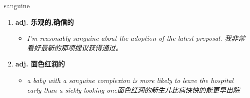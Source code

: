 
\begin{frame}
{\huge sanguine}
\begin{center}
\begin{enumerate}\Large
  \item \textbf{adj. 乐观的,确信的}
  \begin{itemize}
    \item \em{\Large{I'm reasonably sanguine about the adoption of the latest proposal. 我非常看好最新的那项提议获得通过。}}
  \end{itemize}
  \item \textbf{adj. 面色红润的}
  \begin{itemize}
    \item \em{\Large{a baby with a sanguine complexion is more likely to leave the hospital early than a sickly-looking one面色红润的新生儿比病怏怏的能更早出院}}
  \end{itemize}
\end{enumerate}
\end{center}
\end{frame}
